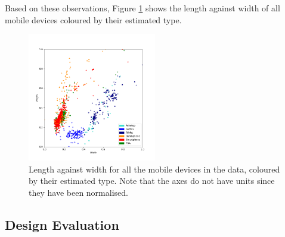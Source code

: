 \documentclass[conference]{IEEEtran}
\begin{document}

Based on these observations, Figure \ref{fig:HeightvsWidth} shows the length
against width of all mobile devices coloured by their estimated type.

\begin{figure}
    \centering
    \includegraphics[width=0.5\textwidth]{../Visualisations/A/length-width-ctype.png}
    \caption{Length against width for all the mobile devices in the data,
	coloured by their estimated type. Note that the axes do not have units
	since they have been normalised.}
    \label{fig:HeightvsWidth}
\end{figure}


\subsection{Design Evaluation}
\end{document}
